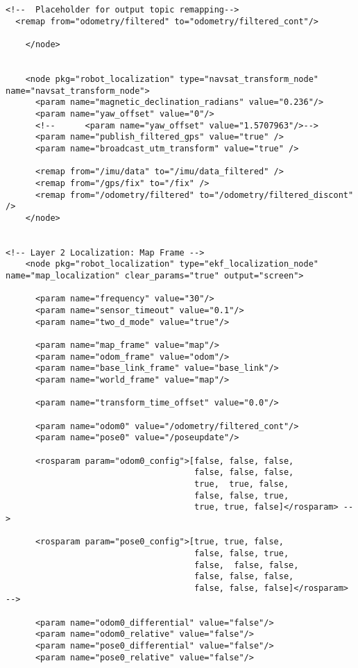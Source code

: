 \begin{lstlisting}[breaklines=true,basicstyle=\tiny]
  <!--  Placeholder for output topic remapping-->
  <remap from="odometry/filtered" to="odometry/filtered_cont"/>
      
    </node>
    

    <node pkg="robot_localization" type="navsat_transform_node" name="navsat_transform_node">
      <param name="magnetic_declination_radians" value="0.236"/>
      <param name="yaw_offset" value="0"/>
      <!--      <param name="yaw_offset" value="1.5707963"/>-->
      <param name="publish_filtered_gps" value="true" />
      <param name="broadcast_utm_transform" value="true" />

      <remap from="/imu/data" to="/imu/data_filtered" />
      <remap from="/gps/fix" to="/fix" />
      <remap from="/odometry/filtered" to="/odometry/filtered_discont" />
    </node>


<!-- Layer 2 Localization: Map Frame -->
    <node pkg="robot_localization" type="ekf_localization_node" name="map_localization" clear_params="true" output="screen">

      <param name="frequency" value="30"/>
      <param name="sensor_timeout" value="0.1"/>
      <param name="two_d_mode" value="true"/>

      <param name="map_frame" value="map"/>
      <param name="odom_frame" value="odom"/>
      <param name="base_link_frame" value="base_link"/>
      <param name="world_frame" value="map"/>

      <param name="transform_time_offset" value="0.0"/>

      <param name="odom0" value="/odometry/filtered_cont"/>
      <param name="pose0" value="/poseupdate"/>

      <rosparam param="odom0_config">[false, false, false,
                                      false, false, false,
                                      true,  true, false,
                                      false, false, true,
                                      true, true, false]</rosparam> -->

      <rosparam param="pose0_config">[true, true, false,
                                      false, false, true,
                                      false,  false, false,
                                      false, false, false,
                                      false, false, false]</rosparam> -->

      <param name="odom0_differential" value="false"/>
      <param name="odom0_relative" value="false"/>
      <param name="pose0_differential" value="false"/>
      <param name="pose0_relative" value="false"/>


\end{lstlisting}
